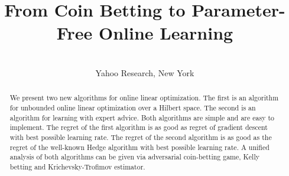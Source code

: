\documentclass[wcp]{jmlr}
\author{%
\Name{Francesco Orabona}
\Email{francesco@orabona.com}
\AND
\Name{D\'avid P\'al}
\Email{dpal@yahoo-inc.com}\\
\addr Yahoo Research, New York}
\title{From Coin Betting to Parameter-Free Online Learning}
\begin{document}
\maketitle

\begin{abstract}
We present two new algorithms for online linear optimization.  The first is an
algorithm for unbounded online linear optimization over a Hilbert space.  The
second is an algorithm for learning with expert advice. Both algorithms are
simple and are easy to implement.  The regret of the first algorithm is as good
as regret of gradient descent with best possible learning rate. The regret of
the second algorithm is as good as the regret of the well-known Hedge algorithm
with best possible learning rate. A unified analysis of both algorithms can be
given via adversarial coin-betting game, Kelly betting and Krichevsky-Trofimov
estimator.
\end{abstract}







%
%
%
%
%




\appendix
%
%
%
%
\end{document}
